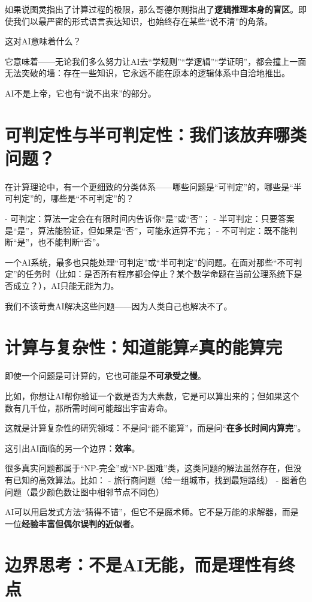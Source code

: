 如果说图灵指出了计算过程的极限，那么哥德尔则指出了\textbf{逻辑推理本身的盲区}。即使我们以最严密的形式语言表达知识，也始终存在某些“说不清”的角落。

这对AI意味着什么？

它意味着——无论我们多么努力让AI去“学规则”“学逻辑”“学证明”，都会撞上一面无法突破的墙：存在一些知识，它永远不能在原本的逻辑体系中自洽地推出。

AI不是上帝，它也有“说不出来”的部分。

\section*{可判定性与半可判定性：我们该放弃哪类问题？}

在计算理论中，有一个更细致的分类体系——哪些问题是“可判定”的，哪些是“半可判定”的，哪些是“不可判定”的？

- 可判定：算法一定会在有限时间内告诉你“是”或“否”；
- 半可判定：只要答案是“是”，算法能验证，但如果是“否”，可能永远算不完；
- 不可判定：既不能判断“是”，也不能判断“否”。

一个AI系统，最多也只能处理“可判定”或“半可判定”的问题。在面对那些“不可判定”的任务时（比如：是否所有程序都会停止？某个数学命题在当前公理系统下是否成立？），AI只能无能为力。

我们不该苛责AI解决这些问题——因为人类自己也解决不了。

\section*{计算与复杂性：知道能算≠真的能算完}

即使一个问题是可计算的，它也可能是\textbf{不可承受之慢}。

比如，你想让AI帮你验证一个数是否为大素数，它是可以算出来的；但如果这个数有几千位，那所需时间可能超出宇宙寿命。

这就是计算复杂性的研究领域：不是问“能不能算”，而是问“\textbf{在多长时间内算完}”。

这引出AI面临的另一个边界：\textbf{效率}。

很多真实问题都属于“NP-完全”或“NP-困难”类，这类问题的解法虽然存在，但没有已知的高效算法。比如：
- 旅行商问题（给一组城市，找到最短路线）
- 图着色问题（最少颜色数让图中相邻节点不同色）

AI可以用启发式方法“猜得不错”，但它不是魔术师。它不是万能的求解器，而是一位\textbf{经验丰富但偶尔误判的近似者}。

\section*{边界思考：不是AI无能，而是理性有终点}

